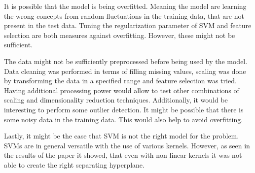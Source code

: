 It is possible that the model is being overfitted. Meaning the model are learning the wrong concepts from random fluctuations in the training data, that are not present in the test data. Tuning the regularization parameter of SVM and feature selection are both measures against overfitting. However, these might not be sufficient. 

The data might not be sufficiently preprocessed before being used by the model. Data cleaning was performed in terms of filling missing values, scaling was done by transforming the data in a specified range and feature selection was tried. Having additional processing power would allow to test other combinations of scaling and dimensionality reduction techniques. Additionally, it would be interesting to perform some outlier detection. It might be possible that there is some noisy data in the training data. This would also help to avoid overfitting.

Lastly, it might be the case that SVM is not the right model for the problem. SVMs are in general versatile with the use of various kernels. However, as seen in the results of the paper it showed, that even with non linear kernels it was not able to create the right separating hyperplane. 




